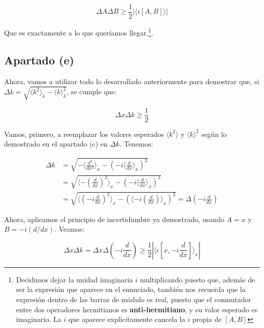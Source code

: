 \begin{equation}
     \Delta A \Delta B \geq \frac{1}{2}|\langle i \left[A,B\right] \rangle|
\end{equation}

Que es exactamente a lo que queríamos llegar.\footnote{Decidimos dejar la unidad imaginaria $i$ multiplicando puesto que, además de ser la expresión que aparece en el enunciado, también nos recuerda que la expresión dentro de las barras de módulo es real, puesto que el conmutador entre dos operadores hermitianos es \textbf{anti-hermitiano}, y su valor esperado es imaginario. La $i$ que aparece explícitamente cancela la $i$ propia de $\left[A,B\right]$}.

\subsection{\textbf{Apartado (e)}}

Ahora, vamos a utilizar todo lo desarrollado anteriormente para demostrar que, si $\Delta k =\sqrt{\langle k^2 \rangle_k-\langle k\rangle^2_k}$, se cumple que:

\begin{equation}
    \Delta x \Delta k \geq \frac{1}{2}
\end{equation}

Vamos, primero, a reemplazar los valores esperados $\langle k^2\rangle $ y $\langle k \rangle ^2$ según lo demostrado en el apartado (c) en $\Delta k$. Tenemos:

\begin{equation}
    \begin{split}
        \Delta k &= \sqrt{-\langle \frac{d^2}{dx^2} \rangle_x-\left(-i\langle \frac{d}{dx}\rangle_x\right)^2}\\
        &=\sqrt{\langle -\left( \frac{d}{dx}\right)^2 \rangle_x-\left(-i\langle \frac{d}{dx}\rangle_x\right)^2}\\
        &=\sqrt{\langle \left(-i\frac{d}{dx}\right)^2 \rangle_x-\left(\langle -i\left(\frac{d}{dx}\right)\rangle_x\right)^2}=\Delta\left(-i\frac{d}{dx}\right)
    \end{split}
\end{equation}

Ahora, aplicamos el principio de incertidumbre ya demostrado, usando $A=x$ y $B=-i(d/dx)$. Veamos:

\begin{equation}
     \Delta x \Delta k =  \Delta x \Delta \left(-i\frac{d}{dx}\right) \geq \frac{1}{2}|\langle i \left[x,-i\frac{d}{dx}\right]\rangle_x|
\end{equation}

